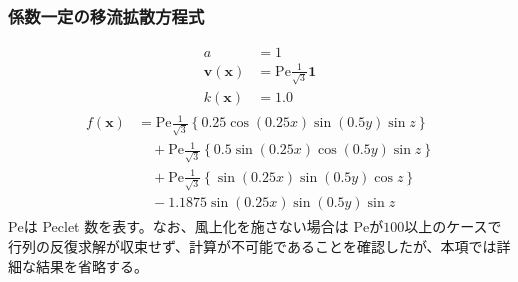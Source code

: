 \documentclass[8pt,a4paper]{article}
\newcommand{\bsm}{\boldsymbol}
\begin{document}
\subsubsection{係数一定の移流拡散方程式}
\begin{align}
	a &= 1 \\
	\bsm{v} (\bsm{x}) &= \mathrm{Pe} \frac{1}{\sqrt{3}}\bsm{1} \\
	k (\bsm{x}) &= 1.0
\end{align}
\begin{align}
	\begin{split}
	f (\bsm{x}) &=  \mathrm{Pe} \frac{1}{\sqrt{3}} \left\{ 0.25 \cos \left( 0.25 x \right) \sin \left( 0.5 y \right) \sin z \right\} \\
		& \quad +\mathrm{Pe} \frac{1}{\sqrt{3}} \left\{ 0.5  \sin \left( 0.25 x \right) \cos \left( 0.5 y \right) \sin z \right\} \\
		& \quad +\mathrm{Pe} \frac{1}{\sqrt{3}} \left\{      \sin \left( 0.25 x \right) \sin \left( 0.5 y \right) \cos z \right\} \\
		& \quad - 1.1875 \sin \left( 0.25 x \right) \sin \left( 0.5 y \right) \sin z
	\end{split}
\end{align}
$\mathrm{Pe}$は Peclet 数を表す。なお、風上化を施さない場合は $\mathrm{Pe}$が$100$以上のケースで行列の反復求解が収束せず、計算が不可能であることを確認したが、本項では詳細な結果を省略する。

\clearpage
\end{document}
